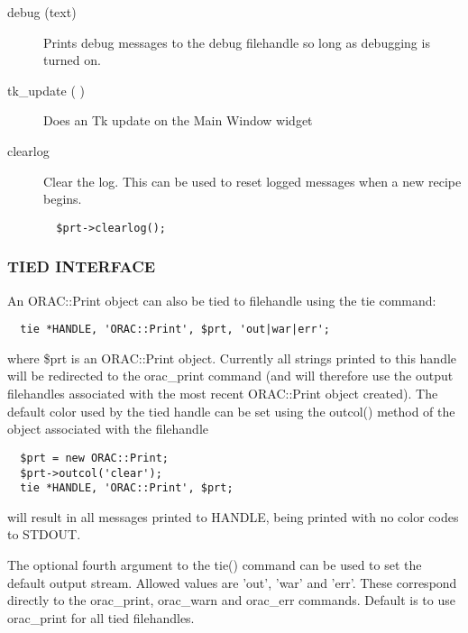 \begin{description}
\begin{description}
\begin{description}
\item[{debug (text)}] \mbox{}

Prints debug messages to the debug filehandle so long as debugging
is turned on.


\item[{tk\_update ( )}] \mbox{}

Does an Tk update on the Main Window widget


\item[{clearlog}] \mbox{}

Clear the log. This can be used to reset logged messages when a new recipe
begins.

\begin{verbatim}
  $prt->clearlog();
\end{verbatim}
\end{description}
\subsubsection*{TIED INTERFACE\label{ORAC::Print_TIED_INTERFACE}}


An ORAC::Print object can also be tied to filehandle using the
tie command:

\begin{verbatim}
  tie *HANDLE, 'ORAC::Print', $prt, 'out|war|err';
\end{verbatim}


where \$prt is an ORAC::Print object. Currently all strings printed
to this handle will be redirected to the orac\_print command
(and will therefore use the output filehandles associated with the
most recent ORAC::Print object created). The default color used
by the tied handle can be set using the outcol() method of the
object associated with the filehandle

\begin{verbatim}
  $prt = new ORAC::Print;
  $prt->outcol('clear');
  tie *HANDLE, 'ORAC::Print', $prt;
\end{verbatim}


will result in all messages printed to HANDLE, being printed
with no color codes to STDOUT.



The optional fourth argument to the tie() command can be used
to set the default output stream. Allowed values are 'out',
'war' and 'err'. These correspond directly to the orac\_print,
orac\_warn and orac\_err commands. Default is to use orac\_print
for all tied filehandles.




\end{description}
\end{description}
